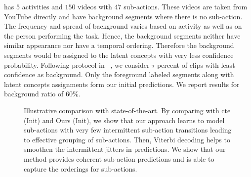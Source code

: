 \documentclass[final]{cvpr}
\begin{document}
 has $5$ activities and $150$ videos with $47$ sub-actions.
These videos are taken from YouTube directly and have background segments where there is no sub-action.  The frequency and spread of background varies based on activity as well as on the person performing the task. Hence, the background segments neither have similar appearance nor have a temporal ordering. Therefore the background segments would be assigned to the latent concepts with very less confidence probability. Following protocol in ~\cite{kukleva2019unsupervised}, we consider $\tau$ percent of clips with least confidence as background. Only the foreground labeled segments along with latent concepts assignments form our initial predictions. We report results for background ratio of 60\%. \begin{figure}[tb]
\centering
{}
\hfil
{}
\caption{{\small Illustrative comparison with state-of-the-art. By comparing with {\sc cte} (Init) and Ours (Init), we show that our approach learns to model sub-actions with very few intermittent sub-action transitions leading to effective grouping of sub-actions.
Then, Viterbi decoding helps to smoothen the intermittent jitters in predictions.
We show that our method provides coherent sub-action predictions and is able to capture the orderings for sub-actions. 
}}
\vspace{-0.3cm}
\label{fig:qual_sota}
\end{figure}
\end{document}
